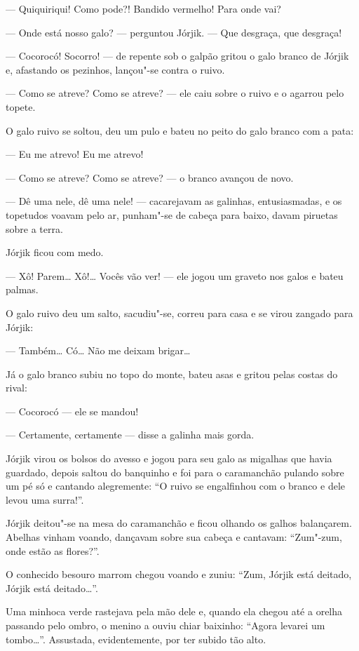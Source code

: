 --- Quiquiriqui! Como pode?! Bandido vermelho! Para onde vai?

--- Onde está nosso galo? --- perguntou Jórjik. --- Que desgraça, que
desgraça!

--- Cocorocó! Socorro! --- de repente sob o galpão gritou o galo branco
de Jórjik e, afastando os pezinhos, lançou"-se contra o ruivo.

--- Como se atreve? Como se atreve? --- ele caiu sobre o ruivo e o
agarrou pelo topete.

O galo ruivo se soltou, deu um pulo e bateu no peito do galo branco com
a pata:

--- Eu me atrevo! Eu me atrevo!

--- Como se atreve? Como se atreve? --- o branco avançou de novo.

--- Dê uma nele, dê uma nele! --- cacarejavam as galinhas,
entusiasmadas, e os topetudos voavam pelo ar, punham"-se de cabeça para
baixo, davam piruetas sobre a terra.

Jórjik ficou com medo.

--- Xô! Parem\ldots{} Xô!\ldots{} Vocês vão ver! --- ele jogou um graveto nos
galos e bateu palmas.

O galo ruivo deu um salto, sacudiu"-se, correu para casa e se virou
zangado para Jórjik:

--- Também\ldots{} Có\ldots{} Não me deixam brigar\ldots{}

Já o galo branco subiu no topo do monte, bateu asas e gritou pelas
costas do rival:

--- Cocorocó --- ele se mandou!

--- Certamente, certamente --- disse a galinha mais gorda.

Jórjik virou os bolsos do avesso e jogou para seu galo as migalhas que
havia guardado, depois saltou do banquinho e foi para o caramanchão pulando sobre um pé só e cantando alegremente: ``O ruivo se
engalfinhou com o branco e dele levou uma surra!''.

Jórjik deitou"-se na mesa do caramanchão e ficou olhando os galhos
balançarem. Abelhas vinham voando, dançavam sobre sua cabeça e cantavam:
``Zum"-zum, onde estão as flores?''.

O conhecido besouro marrom chegou voando e zuniu: ``Zum, Jórjik está
deitado, Jórjik está deitado\ldots{}''.

Uma minhoca verde rastejava pela mão dele e, quando ela chegou até a
orelha passando pelo ombro, o menino a ouviu chiar baixinho: ``Agora levarei um
tombo\ldots{}''. Assustada, evidentemente, por ter subido tão alto.

